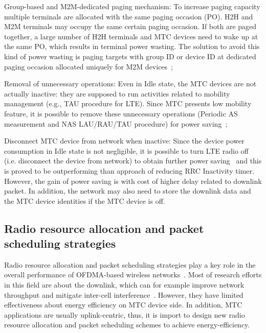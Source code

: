 \begin{inparaenum}[(1)]
	\item Group-based and M2M-dedicated paging mechanism: To increase paging capacity multiple terminals are allocated with the same paging occasion (PO). H2H and M2M terminals may occupy the same certain paging occasion. If both are paged together, a large number of H2H terminals and MTC devices need to wake up at the same PO, which results in terminal power wasting. The solution to avoid this kind of power wasting is paging targets with group ID or device ID at dedicated paging occasion allocated uniquely for M2M devices~\cite{ChaoCW11};\\
	\item Removal of unnecessary operations: Even in Idle state, the MTC devices are not actually inactive: they are supposed to run activities related to mobility management (e.g., TAU procedure for LTE). Since MTC presents low mobility feature, it is possible to remove these unnecessary operations (Periodic AS measurement and NAS LAU/RAU/TAU procedure) for power saving~\cite{ChaoCW11};\\
	\item Disconnect MTC device from network when inactive: Since the device power consumption in Idle state is not negligible, it is possible to turn LTE radio off (i.e. disconnect the device from network) to obtain further power saving~\cite{scjha2014} and this is proved to be outperforming than approach of reducing RRC Inactivity timer. However, the gain of power saving is with cost of higher delay related to downlink packet. In addition, the network may also need to store the downlink data and the MTC device identities if the MTC device is off. 
\end{inparaenum}
\subsection{Radio resource allocation and packet scheduling strategies}
Radio resource allocation and packet scheduling strategies play a key role in the overall performance of OFDMA-based wireless networks~\cite{gotsis2007radio}. Most of research efforts in this field are about the downlink, which can for example improve network throughput and mitigate inter-cell interference~\cite{lopez2013distributed}\cite{ding2014small}. However, they have limited effectiveness about energy efficiency on MTC device side. In addition, MTC applications are usually uplink-centric, thus, it is import to design new radio resource allocation and packet scheduling schemes to achieve energy-efficiency.

